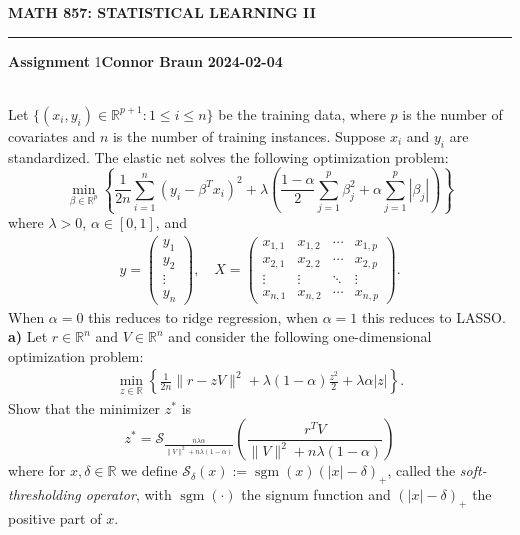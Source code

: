 \documentclass[10pt]{article}
\newcommand{\bp}[1]{\left({#1}\right)}
\newcommand{\mbb}[1]{\mathbb{#1}}
\newcommand{\1}[1]{\mathbbm{1}_{#1}}
\newcommand{\mc}[1]{\mathcal{#1}}
\DeclareMathOperator{\sgm}{sgm}
\begin{document}
    \begin{center}
        {\bf\large{MATH 857: STATISTICAL LEARNING II}}
        \smallskip
        \hrule
        \smallskip
        {\bf Assignment} 1\hfill {\bf Connor Braun} \hfill {\bf 2024-02-04}
    \end{center}
    \\[5pt]
    Let $\{(x_i,y_i)\in\mbb{R}^{p+1}:1\leq i\leq n\}$ be the training data, where $p$ is the number
    of covariates and $n$ is the number of training instances. Suppose $x_i$ and $y_i$ are standardized.
    The elastic net solves the following optimization problem:
    \[\min_{\beta\in\mbb{R}^p}\left\{\frac{1}{2n}\sum_{i=1}^n(y_i-\beta^Tx_i)^2+\lambda\bp{\frac{1-\alpha}{2}\sum_{j=1}^p\beta_j^2+\alpha\sum_{j=1}^p|\beta_j|}\right\}\]
    where $\lambda>0$, $\alpha\in[0,1]$, and 
    \begin{align*}
        y=\begin{pmatrix}
            y_1\\
            y_2\\
            \vdots\\
            y_n
        \end{pmatrix},\quad X=\begin{pmatrix}
            x_{1,1} & x_{1,2} & \cdots & x_{1,p}\\
            x_{2,1} & x_{2,2} & \cdots & x_{2,p}\\
            \vdots & \vdots & \ddots & \vdots\\
            x_{n,1} & x_{n,2} & \cdots & x_{n,p}
        \end{pmatrix}.
    \end{align*}
    When $\alpha=0$ this reduces to ridge regression, when $\alpha=1$ this reduces to LASSO.\\[5pt]
    {\bf a)}\hspace{5pt} Let $r\in\mbb{R}^n$ and $V\in\mbb{R}^n$ and consider the following one-dimensional optimization problem:
    \begin{align*}
        \min_{z\in\mbb{R}}\left\{\frac{1}{2n}\|r-zV\|^2+\lambda(1-\alpha)\frac{z^2}{2}+\lambda\alpha|z|\right\}.
    \end{align*}
    Show that the minimizer $z^\ast$ is
    \[z^\ast=\mc{S}_{\frac{n\lambda\alpha}{\|V\|^2+n\lambda(1-\alpha)}}\bp{\frac{r^TV}{\|V\|^2+n\lambda(1-\alpha)}}\] 
    where for $x,\delta\in\mbb{R}$ we define $\mc{S}_\delta(x):=\sgm(x)(|x|-\delta)_+$, called the {\it soft-thresholding operator}, with $\sgm(\cdot)$
    the signum function and $(|x|-\delta)_+$ the positive part of $x$.\\[5pt]
\end{document}
